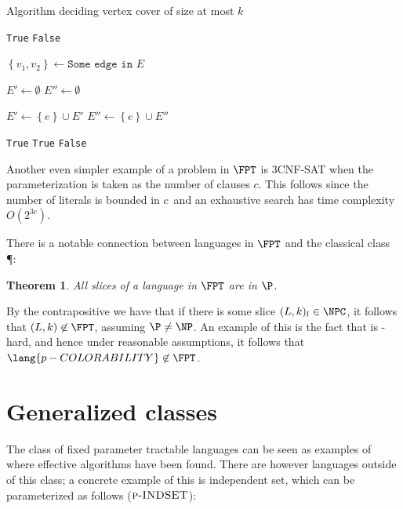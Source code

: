 \documentclass[a4paper,11pt]{report}
\theoremstyle{plain}
\newtheorem{thm}{Theorem}[chapter] %
\theoremstyle{definition}
\begin{document}
\begin{algorithm}
\begin{algorithmic}
\caption{Algorithm deciding vertex cover of size at most $k$}
\label{fpt-vertex-cover}
    \Return \texttt{True}
    \Return \texttt{False}
\EndIf

\State $\left\{v_1, v_2\right\} \gets \texttt{Some edge in } E$

\State $E'\gets \emptyset$
\State $E''\gets \emptyset$

      \State $E'\gets \left\{e\right\}\cup E'$
  \EndIf
      \State $E''\gets \left\{e\right\}\cup E''$
  \EndIf
\EndFor

    \Return \texttt{True}
    \Return \texttt{True}
\Else {}
    \Return \texttt{False}
\EndIf

\EndProcedure
\end{algorithmic}
\end{algorithm}

Another even simpler example of a problem in $\FPT$ is \textsc{3CNF-SAT} when the parameterization is taken as the number of clauses $c$.
This follows since the number of literals is bounded in $c$ and an exhaustive search has time complexity $O(2^{3c})$.

There is a notable connection between languages in $\FPT$ and the classical class \P \cite{FG06}:

\begin{thm}
All slices of a language in $\FPT$ are in $\P$.
\end{thm}

By the contrapositive we have that if there is some slice $(L, k)_{l} \in \NPC$, it follows that $(L, k) \not \in \FPT$, assuming $\P \not = \NP$.
An example of this is the fact that  is \NP-hard, and hence under reasonable assumptions, it follows that $\lang{p-COLORABILITY} \not \in \FPT$.

\section{Generalized classes}
The class of fixed parameter tractable languages can be seen as examples of where effective algorithms have been found.
There are however languages outside of this class; a concrete example of this is independent set, which can be parameterized as follows ($\textsc{p-INDSET}$):
\end{document}
